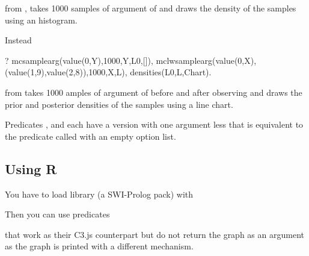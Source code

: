 \documentclass[letterpaper,10pt,english]{sphinxmanual}
\begin{document}
from , takes 1000 samples of argument  of  and draws the density of the samples using an histogram.

Instead

\begin{sphinxVerbatim}[commandchars=\\\{\}]
?\PYGZhy{} mc\PYGZus{}sample\PYGZus{}arg(value(0,Y),1000,Y,L0,[]),
mc\PYGZus{}lw\PYGZus{}sample\PYGZus{}arg(value(0,X),
(value(1,9),value(2,8)),1000,X,L),
densities(L0,L,Chart).
\end{sphinxVerbatim}

from  takes 1000 amples of argument  of  before and after observing  and draws the prior and posterior densities of the samples using a line chart.

Predicates ,  and  each have a version with one argument less that is equivalent to the predicate called with an empty option list.


\subsection{Using R}
\label{\detokenize{index:using-r}}
You have to load library  (a SWI-Prolog pack) with

\begin{sphinxVerbatim}[commandchars=\\\{\}]
 
\end{sphinxVerbatim}

Then you can use predicates

\begin{sphinxVerbatim}[commandchars=\\\{\}]
\end{sphinxVerbatim}

that work as their C3.js counterpart but do not return the graph as an argument as the graph is printed with a different mechanism.
\end{document}

